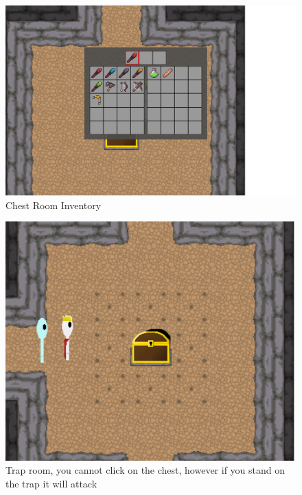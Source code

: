 \documentclass[../Main.tex]{subfiles}
\begin{document}
            \begin{figure}[hbt!]
                \centerline{\includegraphics[scale=0.3]{img/Testing/Objective/ChestRoomInventory.png}}
                \caption{Chest Room Inventory}
                \label{fig:ChestRoomInventory}
            \end{figure}
            \begin{figure}[hbt!]
                \centerline{\includegraphics[scale=0.4]{img/Testing/Objective/TrapRoom.png}}
                \caption{Trap room, you cannot click on the chest, however if you stand on the trap it will attack}
                \label{fig:TrapRoom}
            \end{figure}
\end{document}
